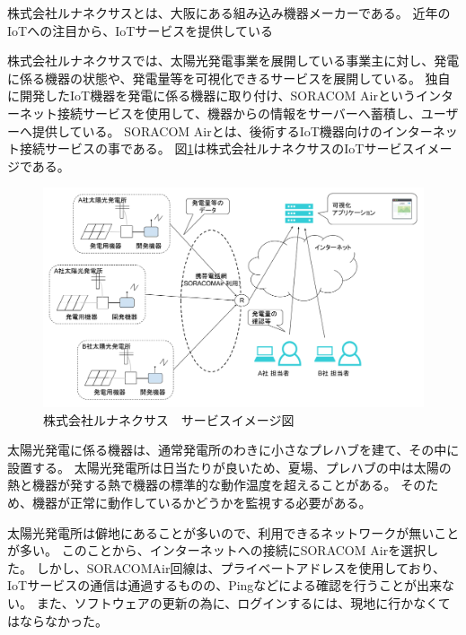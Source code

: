 株式会社ルナネクサスとは、大阪にある組み込み機器メーカーである。
近年のIoTへの注目から、IoTサービスを提供している

株式会社ルナネクサスでは、太陽光発電事業を展開している事業主に対し、発電に係る機器の状態や、発電量等を可視化できるサービスを展開している。
独自に開発したIoT機器を発電に係る機器に取り付け、SORACOM Airというインターネット接続サービスを使用して、機器からの情報をサーバーへ蓄積し、ユーザーへ提供している。
SORACOM Airとは、後術するIoT機器向けのインターネット接続サービスの事である。
図\ref{fig:lunafig}は株式会社ルナネクサスのIoTサービスイメージである。
\begin{figure}[htbp]
\includegraphics[width=16cm]{images/lunafig.png}
\caption{株式会社ルナネクサス　サービスイメージ図}
\label{fig:lunafig}
\end{figure}



太陽光発電に係る機器は、通常発電所のわきに小さなプレハブを建て、その中に設置する。
太陽光発電所は日当たりが良いため、夏場、プレハブの中は太陽の熱と機器が発する熱で機器の標準的な動作温度を超えることがある。
そのため、機器が正常に動作しているかどうかを監視する必要がある。

太陽光発電所は僻地にあることが多いので、利用できるネットワークが無いことが多い。
このことから、インターネットへの接続にSORACOM Airを選択した。
しかし、SORACOMAir回線は、プライベートアドレスを使用しており、IoTサービスの通信は通過するものの、Pingなどによる確認を行うことが出来ない。
また、ソフトウェアの更新の為に、ログインするには、現地に行かなくてはならなかった。

